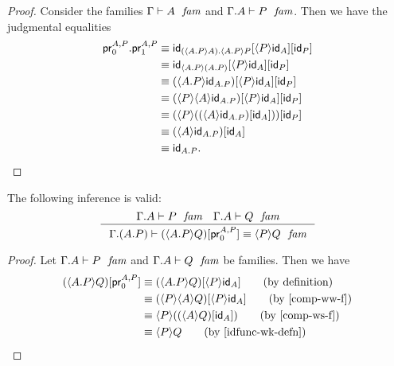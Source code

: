 \begin{proof}
Consider the families $\jfam{\Gamma}{A}$ and $\jfam{{\Gamma}{A}}{P}$. Then
we have the judgmental equalities
\begin{align*}
\tmext{\ctxwk{\ctxext{A}{P}}{A}}{\ctxwk{\ctxext{A}{P}}{P}}{\cprojfstf{A}{P}}{\cprojsndf{A}{P}}
& \jdeq \unfold{\tmext{\ctxwk{\ctxext{A}{P}}{A}}{\ctxwk{\ctxext{A}{P}}{P}}{\cprojfstf{A}{P}}{\cprojsndf{A}{P}}}\\
& \jdeq \subst
          {\idfunc[P]}
          { {\ctxwk{P}{\idfunc[A]}}
            {\idfunc[\ctxwk{\ctxext{A}{P}}{\ctxext{A}{P}}]}}\\
& \jdeq \subst
          {\idfunc[P]}
          { {\ctxwk{P}{\idfunc[A]}}
            {\ctxwk{\ctxext{A}{P}}{\idfunc[\ctxext{A}{P}]}}}\\
& \jdeq \subst
          {\idfunc[P]}
          { {\ctxwk{P}{\idfunc[A]}}
            {\ctxwk{P}{{A}{\idfunc[\ctxext{A}{P}]}}}}\\
& \jdeq \subst
          {\idfunc[P]}
          {\ctxwk
            {P}
            {\subst
              {\idfunc[A]}
              {\ctxwk{A}{\idfunc[\ctxext{A}{P}]}}}}\\
& \jdeq \subst
          {\idfunc[A]}
          {\ctxwk{A}{\idfunc[\ctxext{A}{P}]}}\\
& \jdeq \idfunc[\ctxext{A}{P}].
\end{align*}
\end{proof}

\begin{lem}
The following inference is valid:
\begin{equation*}
\inference
  {\jfam{{\Gamma}{A}}{P}
   \jfam{{\Gamma}{A}}{Q}}
  {\jfameq{{\Gamma}{{A}{P}}}{\subst{\cprojfstf{A}{P}}{\ctxwk{\ctxext{A}{P}}{Q}}}{\ctxwk{P}{Q}}}
\end{equation*}
\end{lem}

\begin{proof}
Let $\jfam{{\Gamma}{A}}{P}$ and $\jfam{{\Gamma}{A}}{Q}$ be
families. Then we have
\begin{align*}
\subst{\cprojfstf{A}{P}}{\ctxwk{\ctxext{A}{P}}{Q}} 
& \jdeq \subst{\ctxwk{P}{\idfunc[A]}}{\ctxwk{\ctxext{A}{P}}{Q}} \tag{by definition}\\
& \jdeq \subst{\ctxwk{P}{\idfunc[A]}}{\ctxwk{P}{{A}{Q}}} \tag{by \autoref{comp-ww-f}}\\
& \jdeq \ctxwk{P}{\subst{\idfunc[A]}{\ctxwk{A}{Q}}} \tag{by \autoref{comp-ws-f}}\\
& \jdeq \ctxwk{P}{Q} \tag{by \autoref{idfunc-wk-defn}}
\end{align*}
\end{proof}

